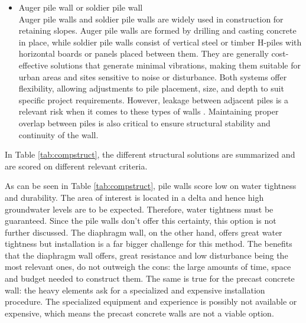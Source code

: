 \begin{itemize}
    \item Auger pile wall or soldier pile wall\\
    Auger pile walls and soldier pile walls are widely used in construction for retaining slopes. Auger pile walls are formed by drilling and casting concrete in place, while soldier pile walls consist of vertical steel or timber H-piles with horizontal boards or panels placed between them. They are generally cost-effective solutions that generate minimal vibrations, making them suitable for urban areas and sites sensitive to noise or disturbance. Both systems offer flexibility, allowing adjustments to pile placement, size, and depth to suit specific project requirements. However, leakage between adjacent piles is a relevant risk when it comes to these types of walls \autocite{mandykorffReaderDeepExcavations2023}. Maintaining proper overlap between piles is also critical to ensure structural stability and continuity of the wall.
\end{itemize}

In Table \ref{tab:compstruct}, the different structural solutions are summarized and are scored on different relevant criteria.

\begin{table}[H]
\centering
\caption{Comparison of structural solutions}
\label{tab:compstruct}
\end{table}

As can be seen in Table \ref{tab:compstruct}, pile walls score low on water tightness and durability. The area of interest is located in a delta and hence high groundwater levels are to be expected. Therefore, water tightness must be guaranteed. Since the pile walls don't offer this certainty, this option is not further discussed. The diaphragm wall, on the other hand, offers great water tightness but installation is a far bigger challenge for this method. The benefits that the diaphragm wall offers, great resistance and low disturbance being the most relevant ones, do not outweigh the cons: the large amounts of time, space and budget needed to construct them. The same is true for the precast concrete wall: the heavy elements ask for a specialized and expensive installation procedure. The specialized equipment and experience is possibly not available or expensive, which means the precast concrete walls are not a viable option.

